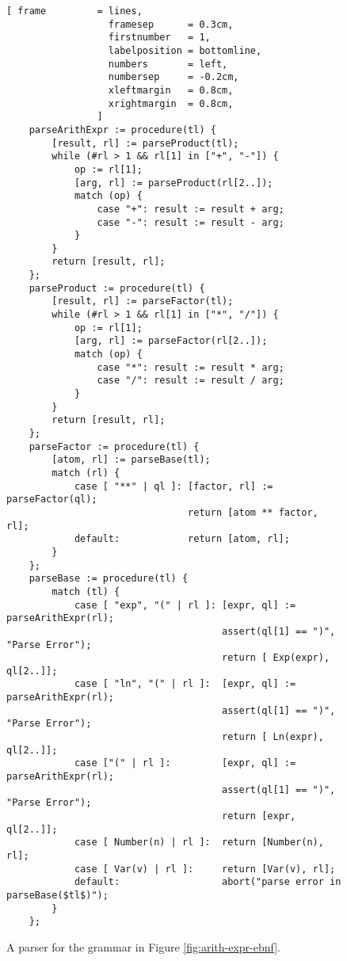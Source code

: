 \begin{figure}[!ht]
\centering
\begin{Verbatim}[ frame         = lines, 
                  framesep      = 0.3cm, 
                  firstnumber   = 1,
                  labelposition = bottomline,
                  numbers       = left,
                  numbersep     = -0.2cm,
                  xleftmargin   = 0.8cm,
                  xrightmargin  = 0.8cm,
                ]
    parseArithExpr := procedure(tl) {
        [result, rl] := parseProduct(tl);
        while (#rl > 1 && rl[1] in ["+", "-"]) {
            op := rl[1];
            [arg, rl] := parseProduct(rl[2..]);
            match (op) {
                case "+": result := result + arg;
                case "-": result := result - arg;
            } 
        }
        return [result, rl];
    };
    parseProduct := procedure(tl) {
        [result, rl] := parseFactor(tl);
        while (#rl > 1 && rl[1] in ["*", "/"]) {
            op := rl[1];
            [arg, rl] := parseFactor(rl[2..]);
            match (op) {
                case "*": result := result * arg;
                case "/": result := result / arg;
            } 
        }
        return [result, rl];
    };
    parseFactor := procedure(tl) {
        [atom, rl] := parseBase(tl);
        match (rl) {
            case [ "**" | ql ]: [factor, rl] := parseFactor(ql);
                                return [atom ** factor, rl];
            default:            return [atom, rl];
        }
    };    
    parseBase := procedure(tl) {
        match (tl) {
            case [ "exp", "(" | rl ]: [expr, ql] := parseArithExpr(rl);
                                      assert(ql[1] == ")", "Parse Error");
                                      return [ Exp(expr), ql[2..]];
            case [ "ln", "(" | rl ]:  [expr, ql] := parseArithExpr(rl);
                                      assert(ql[1] == ")", "Parse Error");
                                      return [ Ln(expr), ql[2..]];
            case ["(" | rl ]:         [expr, ql] := parseArithExpr(rl);
                                      assert(ql[1] == ")", "Parse Error");
                                      return [expr, ql[2..]];
            case [ Number(n) | rl ]:  return [Number(n), rl];
            case [ Var(v) | rl ]:     return [Var(v), rl];
            default:                  abort("parse error in parseBase($tl$)");
        }
    };
\end{Verbatim}
\vspace*{-0.3cm}
\caption{A parser for the grammar in Figure \ref{fig:arith-expr-ebnf}.}
\label{fig:differentiate.stlx}
\end{figure}

